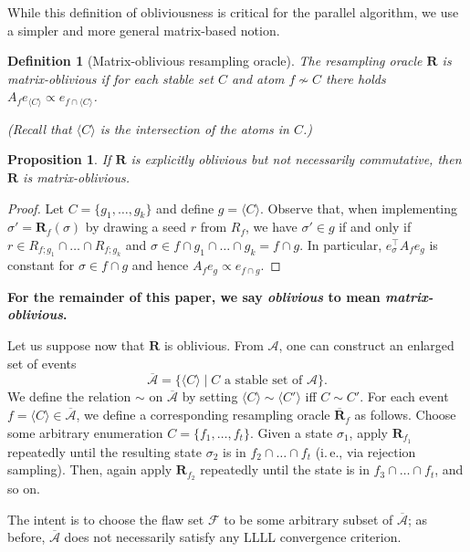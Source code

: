 \documentclass[11pt]{article}
\newtheorem{proposition}[theorem]{Proposition}
\newtheorem{definition}[theorem]{Definition}
\newcommand{\ie}{i.\,e.}
\newcommand\oa{\overline{\mathcal A}}
\newcommand\obr{\overline{\mathbf R}}
\begin{document}
While this definition of obliviousness is critical for the parallel algorithm, we use a simpler and more general matrix-based notion.

\begin{definition}[Matrix-oblivious resampling oracle]
The resampling oracle $\mathbf R$ is \emph{matrix-oblivious} if for each stable set $C$ and atom $f \not \sim C$ there holds $ A_f e_{\langle C \rangle} \propto e_{f \cap \langle C \rangle}$.

 (Recall that $\langle C \rangle$ is the intersection of the atoms in $C$.)
\end{definition}

\begin{proposition}
\label{obl-p0}
If $\mathbf R$ is explicitly oblivious but not necessarily commutative, then $\mathbf R$ is matrix-oblivious.
  \end{proposition}
  \begin{proof}
  Let $C = \{g_1, \dots, g_k \}$ and define $g = \langle C \rangle$. Observe that, when implementing $\sigma' = \mathbf R_f(\sigma)$ by drawing a seed $r$ from $R_f$, we have $\sigma' \in g$ if and only if $r \in R_{f;g_1} \cap \dots \cap R_{f;g_k}$ and $\sigma \in f \cap g_1 \cap \dots \cap g_k = f \cap g$.  In particular, $e_{\sigma}^{\top} A_f e_g$ is constant for $\sigma \in f \cap g$ and hence $A_f e_g \propto e_{f \cap g}$.  
  \end{proof}
  
\textbf{For the remainder of this paper, we say \emph{oblivious} to mean \emph{matrix-oblivious}.}  

Let us suppose now that $\mathbf R$ is oblivious.   From $\mathcal A$, one can construct an enlarged set of events 
$$
\oa = \{ \langle C \rangle \mid \text{$C$ a stable set of $\mathcal A$} \}.
$$
We define the relation $\sim$ on $\oa$ by setting $\langle C \rangle \sim \langle C' \rangle$ iff $C \sim C'$. For each event $f = \langle C \rangle \in \oa$, we define a corresponding resampling oracle $\obr_f$ as follows. Choose some arbitrary enumeration $C = \{ f_1, \dots, f_t \}$. Given a state $\sigma_1$, apply $\mathbf R_{f_1}$ repeatedly until the resulting state $\sigma_2$ is in $f_2 \cap \dots \cap f_t$ (\ie, via rejection sampling). Then, again apply $\mathbf R_{f_2}$ repeatedly until the state is in $f_3 \cap \dots \cap f_t$, and so on.

 The intent is to choose the flaw set $\mathcal F$ to be some arbitrary subset of $\oa$;  as before, $\oa$ does not necessarily satisfy any LLLL convergence criterion.   
\end{document}
